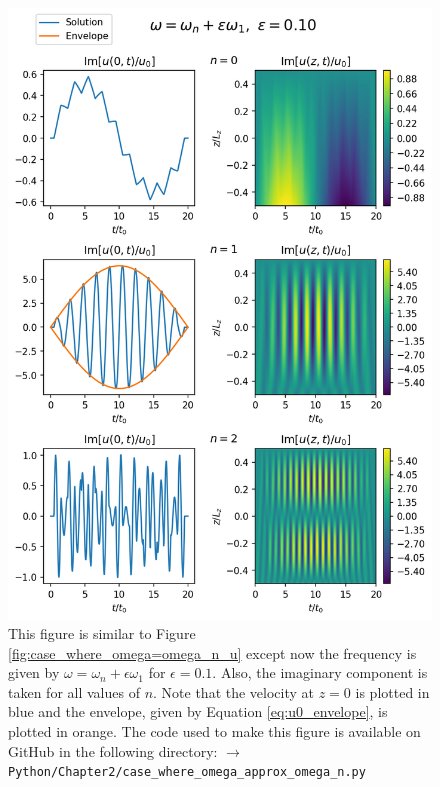 \begin{figure}
    \centering
    \vspace{-20pt}
    \includegraphics[width=\textwidth,height=0.85\textheight,keepaspectratio]{figures/chapter02/case_where_omega_approx_omega_n_u.png}
    \vspace{-10pt}
    \caption{This figure is similar to Figure \ref{fig:case_where_omega=omega_n_u} except now the frequency is given by $\omega=\omega_n+\epsilon \omega_1$ for $\epsilon=0.1$. Also, the imaginary component is taken for all values of $n$. Note that the velocity at $z=0$ is plotted in blue and the envelope, given by Equation \eqref{eq:u0_envelope}, is plotted in orange. The code used to make this figure is available on GitHub in the following directory:\newline
    \texttt{$\rightarrow$ Python/Chapter2/case\_where\_omega\_approx\_omega\_n.py}}
    \label{fig:case_where_omega_approx_omega_n_u}
    \vspace{-30pt}
\end{figure}

